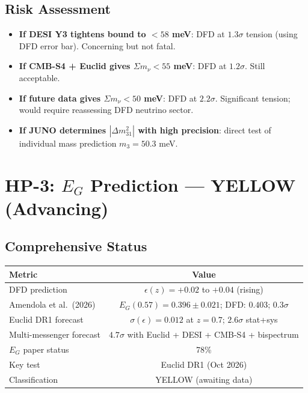 \documentclass[11pt,a4paper]{article}
\begin{document}
\subsection{Risk Assessment}
\begin{itemize}[nosep]
\item \textbf{If DESI Y3 tightens bound to $< 58$ meV}: DFD at $1.3\sigma$ tension (using DFD error bar). Concerning but not fatal.
\item \textbf{If CMB-S4 + Euclid gives $\Sigma m_\nu < 55$ meV}: DFD at $1.2\sigma$. Still acceptable.
\item \textbf{If future data gives $\Sigma m_\nu < 50$ meV}: DFD at $2.2\sigma$. Significant tension; would require reassessing DFD neutrino sector.
\item \textbf{If JUNO determines $|\Delta m^2_{31}|$ with high precision}: direct test of individual mass prediction $m_3 = 50.3$ meV.
\end{itemize}

\section{HP-3: $E_G$ Prediction --- YELLOW (Advancing)}

\subsection{Comprehensive Status}
\begin{center}
\begin{tabular}{lc}
\toprule
\textbf{Metric} & \textbf{Value} \\
\midrule
DFD prediction & $\epsilon(z) = +0.02$ to $+0.04$ (rising) \\
Amendola et al.\ (2026) & $E_G(0.57) = 0.396 \pm 0.021$; DFD: $0.403$; $0.3\sigma$ \\
Euclid DR1 forecast & $\sigma(\epsilon) = 0.012$ at $z = 0.7$; $2.6\sigma$ stat+sys \\
Multi-messenger forecast & $4.7\sigma$ with Euclid + DESI + CMB-S4 + bispectrum \\
$E_G$ paper status & 78\% \\
Key test & Euclid DR1 (Oct 2026) \\
Classification & YELLOW (awaiting data) \\
\bottomrule
\end{tabular}
\end{center}
\end{document}
